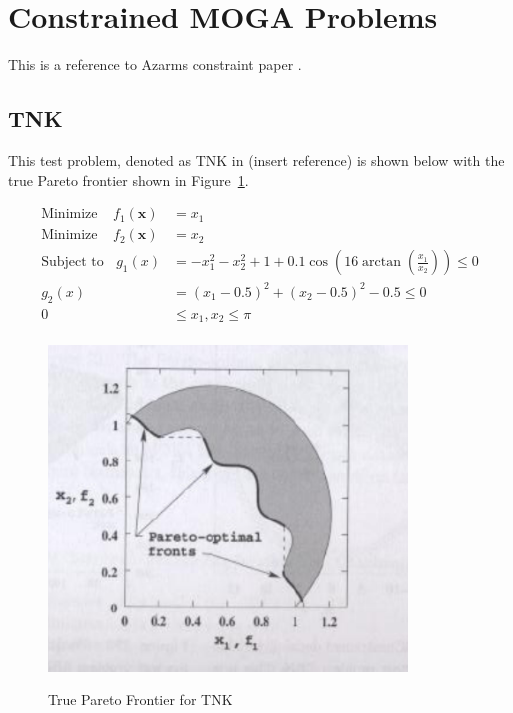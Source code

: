 \documentclass{article}
\begin{document}
\section{Constrained MOGA Problems}
This is a reference to Azarms constraint paper \cite{kurpati2002constraint}. %
 
\subsection{TNK} 
This test problem, denoted as TNK in (insert reference) is shown below with the true Pareto frontier shown in Figure~\ref{fig:TNK_true}.


\begin{align*}
\textrm{Minimize} ~~~~~ f_1(\textbf{x}) &= x_1 \\
\textrm{Minimize} ~~~~~ f_2(\textbf{x}) &= x_2 \\
\textrm{Subject to} ~~~~ g_1(x) &= -x_1^2-x_2^2+1+0.1\cos(16\arctan(\frac{x_1}{x_2})) \leq 0 \\
g_2(x) &= (x_1 - 0.5)^2 + (x_2 - 0.5)^2 -0.5 \leq 0 \\
0 &\leq  x_1,x_2 \leq \pi \\
\end{align*}
\begin{figure}[h]
  \caption{True Pareto Frontier for TNK}
  \centering
  \includegraphics[width=0.85\textwidth]{TNK_pareto_true.png}  
  \label{fig:TNK_true}
\end{figure}
\end{document}
